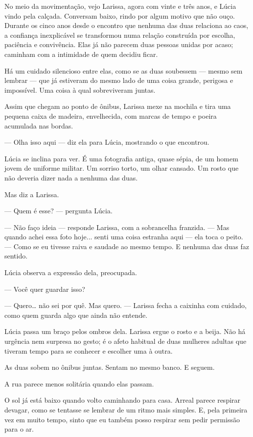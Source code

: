 No meio da movimentação, vejo Larissa, agora com vinte e três anos, e Lúcia vindo pela calçada. Conversam baixo, rindo por algum motivo que não ouço. Durante os cinco anos desde o encontro que nenhuma das duas relaciona ao caos, a confiança inexplicável se transformou numa relação construída por escolha, paciência e convivência. Elas já não parecem duas pessoas unidas por acaso; caminham com a intimidade de quem decidiu ficar.

Há um cuidado silencioso entre elas, como se as duas soubessem — mesmo sem lembrar — que já estiveram do mesmo lado de uma coisa grande, perigosa e impossível. Uma coisa à qual sobreviveram juntas.

Assim que chegam ao ponto de ônibus, Larissa mexe na mochila e tira uma pequena caixa de madeira, envelhecida, com marcas de tempo e poeira acumulada nas bordas.

— Olha isso aqui — diz ela para Lúcia, mostrando o que encontrou.

Lúcia se inclina para ver. É uma fotografia antiga, quase sépia, de um homem jovem de uniforme militar. Um sorriso torto, um olhar cansado. Um rosto que não deveria dizer nada a nenhuma das duas.

Mas diz a Larissa.

— Quem é esse? — pergunta Lúcia.

— Não faço ideia — responde Larissa, com a sobrancelha franzida. — Mas quando achei essa foto hoje... senti uma coisa estranha aqui — ela toca o peito. — Como se eu tivesse raiva e saudade ao mesmo tempo. E nenhuma das duas faz sentido.

Lúcia observa a expressão dela, preocupada.

— Você quer guardar isso?

— Quero… não sei por quê. Mas quero. — Larissa fecha a caixinha com cuidado, como quem guarda algo que ainda não entende.

Lúcia passa um braço pelos ombros dela. Larissa ergue o rosto e a beija. Não há urgência nem surpresa no gesto; é o afeto habitual de duas mulheres adultas que tiveram tempo para se conhecer e escolher uma à outra.

As duas sobem no ônibus juntas. Sentam no mesmo banco. E seguem.

A rua parece menos solitária quando elas passam.

\bigskip

O sol já está baixo quando volto caminhando para casa. Arreal parece respirar devagar, como se tentasse se lembrar de um ritmo mais simples. E, pela primeira vez em muito tempo, sinto que eu também posso respirar sem pedir permissão para o ar.

